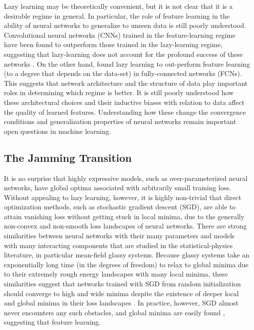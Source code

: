 \documentclass[11pt]{article}
\begin{document}
Lazy learning may be theoretically convenient, but it is not clear that it is a desirable regime in general. In particular, the role of feature learning in the ability of neural networks to generalize to unseen data is still poorly understood. Convolutional neural networks (CNNs) trained in the feature-learning regime have been found to outperform those trained in the lazy-learning regime, suggesting that lazy-learning does not account for the profound success of these networks \cite{chizatLazyTrainingDifferentiable2020}. On the other hand, \cite{geigerDisentanglingFeatureLazy2020} found lazy learning to out-perform feature learning (to a degree that depends on the data-set) in fully-connected networks (FCNs). This suggests that network architecture and the structure of data play important roles in determining which regime is better. It is still poorly understood how these architectural choices and their inductive biases with relation to data affect the quality of learned features. Understanding how these change the convergence conditions and generalization properties of neural networks remain important open questions in machine learning. 
 
\subsection{The Jamming Transition}

It is no surprise that highly expressive models, such as over-parameterized neural networks, have global optima associated with arbitrarily small training loss. Without appealing to lazy learning, however, it is highly non-trivial that direct optimization methods, such as stochastic gradient descent (SGD), are able to attain vanishing loss without getting stuck in local minima, due to the generally non-convex and non-smooth loss landscapes of neural networks. There are strong similarities between neural networks with their many parameters and models with many interacting components that are studied in the statistical-physics literature, in particular mean-field glassy systems. Because glassy systems take an exponentially long time (in the degrees of freedom) to relax to global minima due to their extremely rough energy landscapes with many local minima, these similarities suggest that networks trained with SGD from random initialization should converge to high and wide minima despite the existence of deeper local and global minima in their loss landscapes \cite{choromanskaLossSurfacesMultilayer}. In practice, however, SGD almost never encounters any such obstacles, and global minima are easily found \cite{goodfellowQualitativelyCharacterizingNeural2015}, suggesting that feature learning.\\
\end{document}
